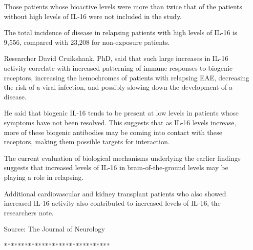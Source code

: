 \documentclass{article}
\begin{document}
Those patients whose bioactive levels were more than twice that of the patients without high levels of IL-16 were not included in the study.

The total incidence of disease in relapsing patients with high levels of IL-16 is 9,556, compared with 23,208 for non-exposure patients.

Researcher David Cruikshank, PhD, said that such large increases in IL-16 activity correlate with increased patterning of immune responses to biogenic receptors, increasing the hemochromes of patients with relapsing EAE, decreasing the risk of a viral infection, and possibly slowing down the development of a disease.

He said that biogenic IL-16 tends to be present at low levels in patients whose symptoms have not been resolved. This suggests that as IL-16 levels increase, more of these biogenic antibodies may be coming into contact with these receptors, making them possible targets for interaction.

The current evaluation of biological mechanisms underlying the earlier findings suggests that increased levels of IL-16 in brain-of-the-ground levels may be playing a role in relapsing.

Additional cardiovascular and kidney transplant patients who also showed increased IL-16 activity also contributed to increased levels of IL-16, the researchers note.

Source: The Journal of Neurology

*******************************
\end{document}
